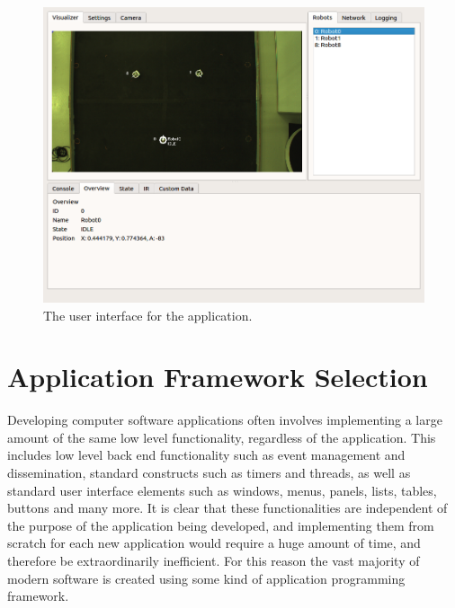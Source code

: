 \begin{figure}
	\centering
	\includegraphics[scale=0.4]{Figures/ApplicationScreenshotOverview.png}
	\decoRule
	\caption[Application User Interface]{The user interface for the application.}
	\label{fig:UI}
\end{figure}

\section{Application Framework Selection} \label{ApplicationFrameworkSelection}
Developing computer software applications often involves implementing a large amount of the same low level functionality, regardless of the application. This includes low level back end functionality such as event management and dissemination, standard constructs such as timers and threads, as well as standard user interface elements such as windows, menus, panels, lists, tables, buttons and many more. It is clear that these functionalities are independent of the purpose of the application being developed, and implementing them from scratch for each new application would require a huge amount of time, and therefore be extraordinarily inefficient. For this reason the vast majority of modern software is created using some kind of application programming framework.

